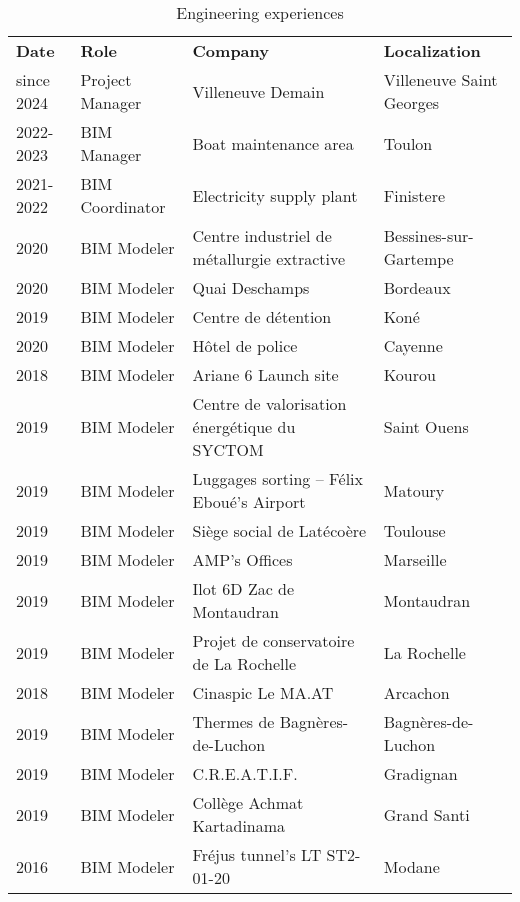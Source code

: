 \documentclass[a4paper,12pt]{article}
\begin{document}
\begin{longtable}{|p{2cm}|p{3cm}|p{5cm}|p{7cm}|}
\caption{Engineering experiences}
\\
\textbf{Date} & \textbf{Role} & \textbf{Company} & \textbf{Localization}\\
since 2024 & Project Manager & Villeneuve Demain & Villeneuve Saint Georges\\
2022-2023 & BIM Manager & Boat maintenance area & Toulon\\
2021-2022 & BIM Coordinator & Electricity supply plant & Finistere\\
2020 & BIM Modeler & Centre industriel de métallurgie extractive & Bessines-sur-Gartempe\\
2020 & BIM Modeler & Quai Deschamps & Bordeaux\\
2019 & BIM Modeler & Centre de détention & Koné\\
2020 & BIM Modeler & Hôtel de police & Cayenne\\
2018 & BIM Modeler & Ariane 6 Launch site & Kourou\\
2019 & BIM Modeler & Centre de valorisation énergétique du SYCTOM & Saint Ouens\\
2019 & BIM Modeler & Luggages sorting – Félix Eboué's Airport & Matoury\\
2019 & BIM Modeler & Siège social de Latécoère & Toulouse\\
2019 & BIM Modeler & AMP's Offices & Marseille\\
2019 & BIM Modeler & Ilot 6D Zac de Montaudran & Montaudran\\
2019 & BIM Modeler & Projet de conservatoire de La Rochelle & La Rochelle\\
2018 & BIM Modeler & Cinaspic Le MA.AT & Arcachon\\
2019 & BIM Modeler & Thermes de Bagnères-de-Luchon & Bagnères-de-Luchon\\
2019 & BIM Modeler & C.R.E.A.T.I.F. & Gradignan\\
2019 & BIM Modeler & Collège Achmat Kartadinama & Grand Santi\\
2016 & BIM Modeler & Fréjus tunnel's LT ST2-01-20 & Modane\\
\end{longtable}
\end{document}
